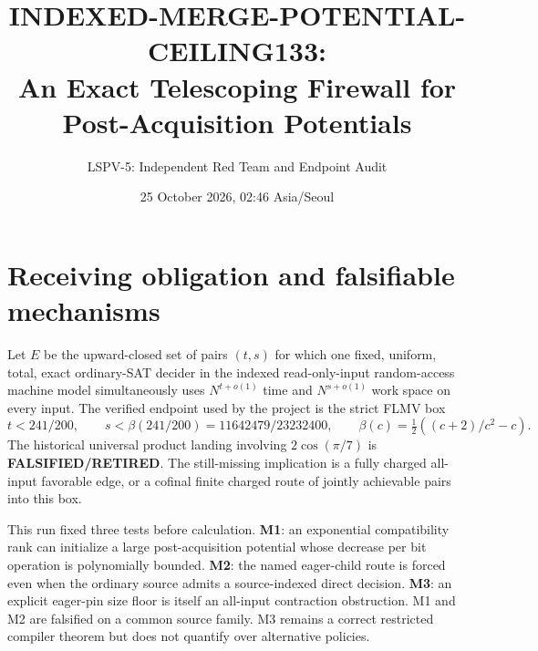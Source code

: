 \documentclass[11pt]{article}
\title{INDEXED-MERGE-POTENTIAL-CEILING133:\\
An Exact Telescoping Firewall for Post-Acquisition Potentials}
\author{LSPV-5: Independent Red Team and Endpoint Audit}
\date{25 October 2026, 02:46 Asia/Seoul}
\begin{document}
\maketitle

\begin{center}
\end{center}

\section{Receiving obligation and falsifiable mechanisms}
Let $E$ be the upward-closed set of pairs $(t,s)$ for which one fixed,
uniform, total, exact ordinary-SAT decider in the indexed read-only-input
random-access machine model simultaneously uses
$N^{t+o(1)}$ time and $N^{s+o(1)}$ work space on every input.  The verified
endpoint used by the project is the strict FLMV box
\[
 t<241/200,\qquad
 s<\beta(241/200)=11642479/23232400,
 \qquad \beta(c)=\tfrac12((c+2)/c^2-c).
\]
The historical universal product landing involving $2\cos(\pi/7)$ is
\textbf{FALSIFIED/RETIRED}.  The still-missing implication is a fully charged
all-input favorable edge, or a cofinal finite charged route of jointly
achievable pairs into this box.

This run fixed three tests before calculation.
\textbf{M1}: an exponential compatibility rank can initialize a large
post-acquisition potential whose decrease per bit operation is polynomially
bounded.  \textbf{M2}: the named eager-child route is forced even when the
ordinary source admits a source-indexed direct decision.  \textbf{M3}: an
explicit eager-pin size floor is itself an all-input contraction obstruction.
M1 and M2 are falsified on a common source family.  M3 remains a correct
restricted compiler theorem but does not quantify over alternative policies.
\end{document}
